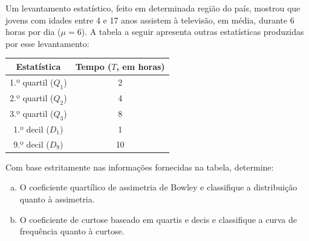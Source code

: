 %
%


\begin{exercicioBanco}[\valorquestao]
Um levantamento estatístico, feito em determinada região do país, mostrou que jovens com idades entre 4 e 17 anos assistem à televisão, em média, durante 6 horas por dia ($\mu = 6$). A tabela a seguir apresenta outras estatísticas produzidas por esse levantamento:

\begin{center}
\begin{tabular}{|c|c|}
\hline
\textbf{Estatística} & \textbf{Tempo ($T$, em horas)} \\ \hline
1.º quartil ($Q_1$) & 2 \\ \hline
2.º quartil ($Q_2$) & 4 \\ \hline
3.º quartil ($Q_3$) & 8 \\ \hline
1.º decil ($D_1$) & 1 \\ \hline
9.º decil ($D_9$) & 10 \\ \hline
\end{tabular}
\end{center}

Com base estritamente nas informações fornecidas na tabela, determine:

\begin{enumerate}[(a)]
    \item O coeficiente quartílico de assimetria de Bowley e classifique a distribuição quanto à assimetria.
    \item O coeficiente de curtose baseado em quartis e decis e classifique a curva de frequência quanto à curtose.
\end{enumerate}
\end{exercicioBanco}
